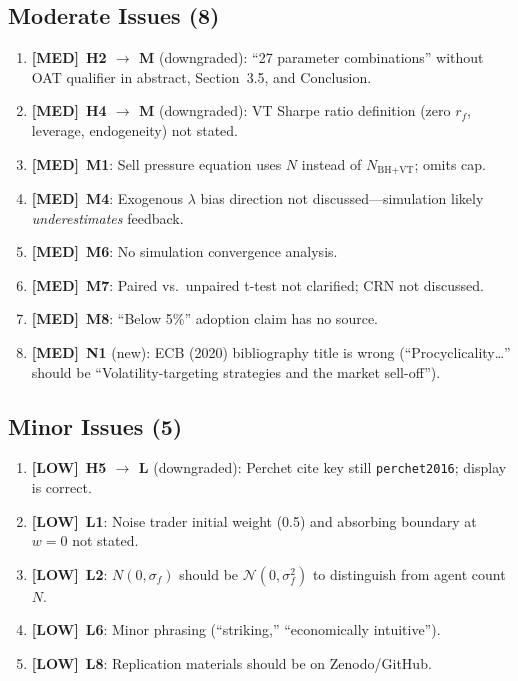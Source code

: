 \documentclass[12pt,a4paper]{article}
\newcommand{\MED}{\textbf{\textcolor{warncolor}{[MED]}}}
\newcommand{\LOW}{\textbf{\textcolor{okgreen}{[LOW]}}}
\begin{document}
\subsection*{\textcolor{warncolor}{Moderate Issues (8)}}

\begin{enumerate}
  \item \MED\ \textbf{H2 $\to$ M} (downgraded): ``27 parameter combinations'' without OAT qualifier in abstract, Section~3.5, and Conclusion.
  \item \MED\ \textbf{H4 $\to$ M} (downgraded): VT Sharpe ratio definition (zero $r_f$, leverage, endogeneity) not stated.
  \item \MED\ \textbf{M1}: Sell pressure equation uses $N$ instead of $N_{\text{BH+VT}}$; omits cap.
  \item \MED\ \textbf{M4}: Exogenous $\lambda$ bias direction not discussed---simulation likely \emph{underestimates} feedback.
  \item \MED\ \textbf{M6}: No simulation convergence analysis.
  \item \MED\ \textbf{M7}: Paired vs.\ unpaired t-test not clarified; CRN not discussed.
  \item \MED\ \textbf{M8}: ``Below 5\%'' adoption claim has no source.
  \item \MED\ \textbf{N1} (new): ECB (2020) bibliography title is wrong (``Procyclicality\ldots'' should be ``Volatility-targeting strategies and the market sell-off'').
\end{enumerate}

\subsection*{Minor Issues (5)}

\begin{enumerate}
  \item \LOW\ \textbf{H5 $\to$ L} (downgraded): Perchet cite key still \texttt{perchet2016}; display is correct.
  \item \LOW\ \textbf{L1}: Noise trader initial weight (0.5) and absorbing boundary at $w=0$ not stated.
  \item \LOW\ \textbf{L2}: $N(0,\sigma_f)$ should be $\mathcal{N}(0,\sigma_f^2)$ to distinguish from agent count $N$.
  \item \LOW\ \textbf{L6}: Minor phrasing (``striking,'' ``economically intuitive'').
  \item \LOW\ \textbf{L8}: Replication materials should be on Zenodo/GitHub.
\end{enumerate}
\end{document}
